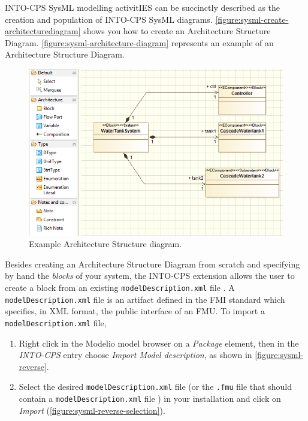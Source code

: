 INTO-CPS SysML modelling activitIES can be succinctly described as the creation and population of INTO-CPS SysML diagrams.
\autoref{figure:sysml-create-architecturediagram} shows you how to create an Architecture Structure Diagram. 
\autoref{figure:sysml-architecture-diagram} represents an example of an Architecture Structure Diagram.
%
\begin{figure}[hpt!]
\centering
\includegraphics[width=\textwidth]{./figures/sysml-architecture-diagram.png}
\caption{Example Architecture Structure diagram.}
\label{figure:sysml-architecture-diagram}
\end{figure}
%
Besides creating an Architecture Structure Diagram from scratch and specifying by hand the \emph{blocks} of your system, the INTO-CPS extension allows the user to create a block from an existing \texttt{model\allowbreak{}Description\allowbreak{}.xml} file .
%
A \texttt{model\allowbreak{}Description\allowbreak{}.xml} file is an artifact defined in the FMI standard which specifies, in XML format, the public interface of an FMU.
%
To import a \texttt{model\allowbreak{}Description\allowbreak{}.xml} file,
%
%
\begin{enumerate}
\item  Right click in the Modelio model browser on a \textit{Package} element, then in the \textit{INTO-CPS} entry choose \textit{Import Model description}, as shown in \autoref{figure:sysml-reverse}.   
%
\item  Select the desired \texttt{model\allowbreak{}Description\allowbreak{}.xml} file (or the \texttt{.fmu} file that should contain a \texttt{model\allowbreak{}Description\allowbreak{}.xml} file ) in your installation and click on \textit{Import} (\autoref{figure:sysml-reverse-selection}).
\end{enumerate}
